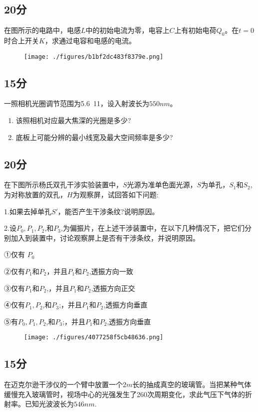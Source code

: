 \subsection{20分}
在图所示的电路中，电感$L$中的初始电流为零，电容上$C$上有初始电荷$Q_0$。在$t=0$时合上开关$K$，求通过电容和电感的电流。
\begin{figure}[ht]
\centering
\texttt{[image: ./figures/b1bf2dc483f8379e.png]}
\caption{} \label{fig_PKU007_1}
\end{figure}
\subsection{15分}
一照相机光圈调节范围为5.6~11，设入射波长为$550nm$。
\begin{enumerate}
\item 该照相机对应最大焦深的光圈是多少?
\item 底板上可能分辨的最小线宽及最大空间频率是多少?
\end{enumerate}
\subsection{20分}
在下图所示杨氏双孔干涉实验装置中，$S$光源为准单色面光源，$S$为单孔，$S_1$和$S_2$,为对称放置的双孔，$H$为观察屏，试回答如下问题:

1.如果去掉单孔$S'$，能否产生干涉条纹?说明原因。

2.设$P_0,P_1,P_2$,和$P_3$,为偏振片，在上述干涉装置中，在以下几种情况下，把它们分别加入到装置中，讨论观察屏上是否有干涉条纹，并说明原因。

①仅有 $P_0$

②仅有$P_1$和$P_2$，并且$P_1$和$P_2$,透振方向一致

③仅有$P_1$和$P_2$,，并且$P_1$和$P_2$,透振方向正交

④仅有$P_1,P_2$,和$P_3$;，并且$P_1$和$P_2$,透振方向垂直

⑤有$P_0,P_1,P_2$,和$P_3$;，并且$P_1$和$P_2$,透振方向垂直
\begin{figure}[ht]
\centering
\texttt{[image: ./figures/4077258f5cb48636.png]}
\caption{} \label{fig_PKU007_2}
\end{figure}
\subsection{15分}
在迈克尔逊干涉仪的一个臂中放置一个$2m$长的抽成真空的玻璃管。当把某种气体缓慢充入玻璃管时，视场中心的光强发生了260次周期变化，求此气压下气体的折射率。已知光波波长为$546nm$.
